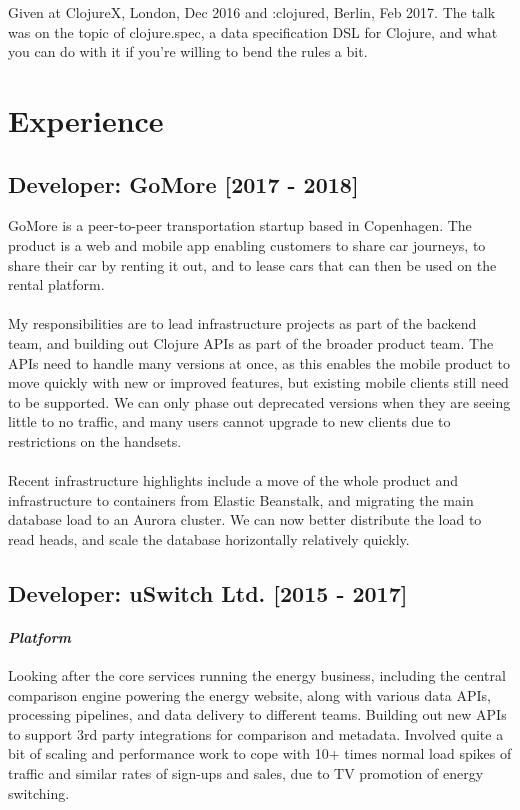 \documentclass{article}
\begin{document}
Given at ClojureX, London, Dec 2016 and :clojured, Berlin, Feb 2017. The talk
was on the topic of clojure.spec, a data specification DSL for Clojure, and what
you can do with it if you're willing to bend the rules a bit.
\section*{Experience}
\subsection*{Developer: GoMore [2017 - 2018]}

GoMore is a peer-to-peer transportation startup based in Copenhagen. The product
is a web and mobile app enabling customers to share car journeys, to share their
car by renting it out, and to lease cars that can then be used on the rental
platform.\\
\\
My responsibilities are to lead infrastructure projects as part of the backend
team, and building out Clojure APIs as part of the broader product team. The
APIs need to handle many versions at once, as this enables the mobile product to
move quickly with new or improved features, but existing mobile clients still
need to be supported. We can only phase out deprecated versions when they are
seeing little to no traffic, and many users cannot upgrade to new clients due to
restrictions on the handsets.\\
\\
Recent infrastructure highlights include a move of the whole product and
infrastructure to containers from Elastic Beanstalk, and migrating the main
database load to an Aurora cluster. We can now better distribute the load to
read heads, and scale the database horizontally relatively quickly.
\subsection*{Developer: uSwitch Ltd. [2015 - 2017]}
\paragraph*{\emph{Platform}}

Looking after the core services running the energy business, including the
central comparison engine powering the energy website, along with various data
APIs, processing pipelines, and data delivery to different teams. Building out
new APIs to support 3rd party integrations for comparison and metadata. Involved
quite a bit of scaling and performance work to cope with 10+ times normal load
spikes of traffic and similar rates of sign-ups and sales, due to TV promotion
of energy switching.
\end{document}
